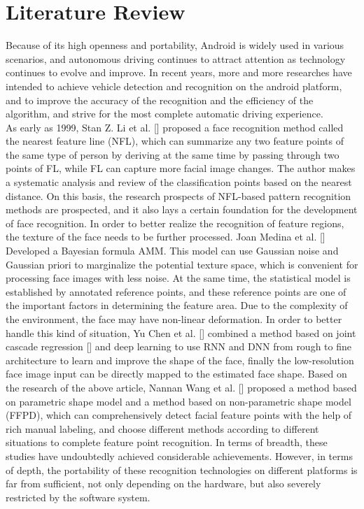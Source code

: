 \documentclass[12pt, a4paper]{article}
\begin{document}
\section*{Literature Review}
Because of its high openness and portability, Android is widely used in various scenarios, and autonomous driving continues to attract attention as technology continues to evolve and improve. In recent years, more and more researches have intended to achieve vehicle detection and recognition on the android platform, and to improve the accuracy of the recognition and the efficiency of the algorithm, and strive for the most complete automatic driving experience. 
\\As early as 1999, Stan Z. Li et al. [] proposed a face recognition method called the nearest feature line (NFL), which can summarize any two feature points of the same type of person by deriving at the same time by passing through two points of FL, while FL can capture more facial image changes. The author makes a systematic analysis and review of the classification points based on the nearest distance. On this basis, the research prospects of NFL-based pattern recognition methods are prospected, and it also lays a certain foundation for the development of face recognition.
In order to better realize the recognition of feature regions, the texture of the face needs to be further processed. Joan Medina et al. [] Developed a Bayesian formula AMM. This model can use Gaussian noise and Gaussian priori to marginalize the potential texture space, which is convenient for processing face images with less noise. At the same time, the statistical model is established by annotated reference points, and these reference points are one of the important factors in determining the feature area.
Due to the complexity of the environment, the face may have non-linear deformation. In order to better handle this kind of situation, Yu Chen et al. [] combined a method based on joint cascade regression [] and deep learning to use RNN and DNN from rough to fine architecture to learn and improve the shape of the face, finally the low-resolution face image input can be directly mapped to the estimated face shape.
Based on the research of the above article, Nannan Wang et al. [] proposed a method based on parametric shape model and a method based on non-parametric shape model (FFPD), which can comprehensively detect facial feature points with the help of rich manual labeling, and choose different methods according to different situations to complete feature point recognition.
In terms of breadth, these studies have undoubtedly achieved considerable achievements. However, in terms of depth, the portability of these recognition technologies on different platforms is far from sufficient, not only depending on the hardware, but also severely restricted by the software system.
\end{document}
